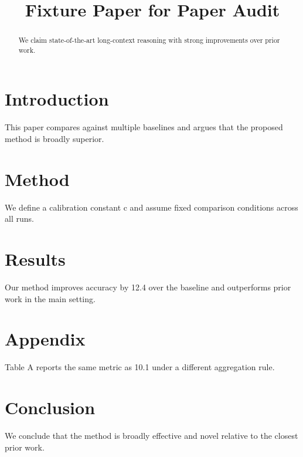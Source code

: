 \title{Fixture Paper for Paper Audit}

\begin{abstract}
We claim state-of-the-art long-context reasoning with strong improvements over prior work.
\end{abstract}
\section{Introduction}
This paper compares against multiple baselines and argues that the proposed method is broadly superior.
\section{Method}
We define a calibration constant c and assume fixed comparison conditions across all runs.
\section{Results}
Our method improves accuracy by 12.4 over the baseline and outperforms prior work in the main setting.
\section{Appendix}
Table A reports the same metric as 10.1 under a different aggregation rule.
\section{Conclusion}
We conclude that the method is broadly effective and novel relative to the closest prior work.

